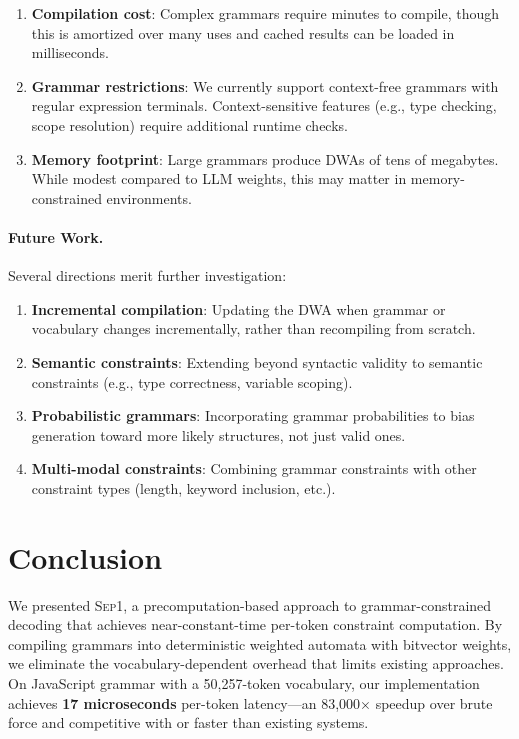 \documentclass[11pt,a4paper]{article}
\newcommand{\sep}{\textsc{Sep1}}
\theoremstyle{plain}
\theoremstyle{definition}
\theoremstyle{remark}
\begin{document}
\begin{enumerate}
\item \textbf{Compilation cost}: Complex grammars require minutes to compile, though this is amortized over many uses and cached results can be loaded in milliseconds.

\item \textbf{Grammar restrictions}: We currently support context-free grammars with regular expression terminals. Context-sensitive features (e.g., type checking, scope resolution) require additional runtime checks.

\item \textbf{Memory footprint}: Large grammars produce DWAs of tens of megabytes. While modest compared to LLM weights, this may matter in memory-constrained environments.
\end{enumerate}

\paragraph{Future Work.}
Several directions merit further investigation:

\begin{enumerate}
\item \textbf{Incremental compilation}: Updating the DWA when grammar or vocabulary changes incrementally, rather than recompiling from scratch.

\item \textbf{Semantic constraints}: Extending beyond syntactic validity to semantic constraints (e.g., type correctness, variable scoping).

\item \textbf{Probabilistic grammars}: Incorporating grammar probabilities to bias generation toward more likely structures, not just valid ones.

\item \textbf{Multi-modal constraints}: Combining grammar constraints with other constraint types (length, keyword inclusion, etc.).
\end{enumerate}

\section{Conclusion}
\label{sec:conclusion}

We presented \sep{}, a precomputation-based approach to grammar-constrained decoding that achieves near-constant-time per-token constraint computation. By compiling grammars into deterministic weighted automata with bitvector weights, we eliminate the vocabulary-dependent overhead that limits existing approaches. On JavaScript grammar with a 50,257-token vocabulary, our implementation achieves \textbf{17 microseconds} per-token latency---an 83,000$\times$ speedup over brute force and competitive with or faster than existing systems.
\end{document}
